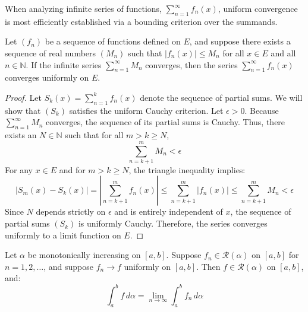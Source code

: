 When analyzing infinite series of functions, $\sum_{n=1}^\infty f_n(x)$, uniform convergence is most efficiently established via a bounding criterion over the summands.

\begin{theorem}
Let $(f_n)$ be a sequence of functions defined on $E$, and suppose there exists a sequence of real numbers $(M_n)$ such that $|f_n(x)| \le M_n$ for all $x \in E$ and all $n \in \mathbb{N}$. If the infinite series $\sum_{n=1}^\infty M_n$ converges, then the series $\sum_{n=1}^\infty f_n(x)$ converges uniformly on $E$.
\end{theorem}

\begin{proof}
Let $S_k(x) = \sum_{n=1}^k f_n(x)$ denote the sequence of partial sums. We will show that $(S_k)$ satisfies the uniform Cauchy criterion. Let $\epsilon > 0$. Because $\sum_{n=1}^\infty M_n$ converges, the sequence of its partial sums is Cauchy. Thus, there exists an $N \in \mathbb{N}$ such that for all $m > k \ge N$,
\[
\sum_{n=k+1}^m M_n < \epsilon
\]
For any $x \in E$ and for $m > k \ge N$, the triangle inequality implies:
\[
|S_m(x) - S_k(x)| = \left| \sum_{n=k+1}^m f_n(x) \right| \le \sum_{n=k+1}^m |f_n(x)| \le \sum_{n=k+1}^m M_n < \epsilon
\]
Since $N$ depends strictly on $\epsilon$ and is entirely independent of $x$, the sequence of partial sums $(S_k)$ is uniformly Cauchy. Therefore, the series converges uniformly to a limit function on $E$.
\end{proof}

\begin{theorem}
Let $\alpha$ be monotonically increasing on $[a, b]$. Suppose $f_n \in \mathcal{R}(\alpha)$ on $[a, b]$ for $n=1, 2, \dots$, and suppose $f_n \to f$ uniformly on $[a, b]$. Then $f \in \mathcal{R}(\alpha)$ on $[a, b]$, and:
\[
\int_a^b f \, d\alpha = \lim_{n \to \infty} \int_a^b f_n \, d\alpha
\]
\end{theorem}

